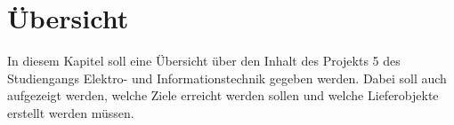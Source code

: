 	\clearpage
\section{Übersicht}\label{sec:Uebersicht}

In diesem Kapitel soll eine Übersicht über den Inhalt des Projekts 5 des Studiengangs Elektro- und Informationstechnik gegeben werden. Dabei soll auch aufgezeigt werden, welche Ziele erreicht werden sollen und welche Lieferobjekte erstellt werden müssen.

 








